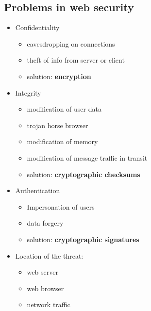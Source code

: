 \documentclass{article}
\begin{document}
\subsection{Problems in web security}
\begin{itemize}
    \item Confidentiality
    \begin{itemize}
        \item eavesdropping on connections
        \item theft of info from server or client
        \item solution: \textbf{encryption}
    \end{itemize}
    \item Integrity
    \begin{itemize}
        \item modification of user data
        \item trojan horse browser
        \item modification of memory
        \item modification of message traffic in transit
        \item solution: \textbf{cryptographic checksums}
    \end{itemize}
    \item Authentication
    \begin{itemize}
        \item Impersonation of users
        \item data forgery
        \item solution: \textbf{cryptographic signatures}
    \end{itemize}
    \item Location of the threat:
    \begin{itemize}
        \item web server
        \item web browser
        \item network traffic
    \end{itemize}
\end{itemize}
\end{document}
